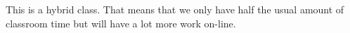 This is a hybrid class. That means that we only have half the usual amount of classroom time but will have a lot more work on-line.